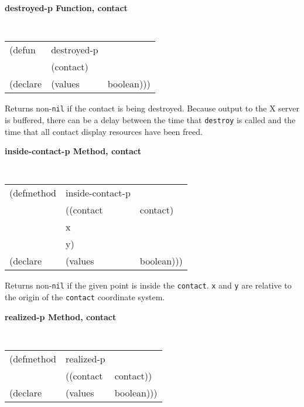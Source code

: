 {\samepage
{\large {\bf destroyed-p \hfill Function, contact}} 
\begin{flushright} \parbox[t]{6.125in}{
\tt
\begin{tabular}{lll}
\raggedright
(defun & destroyed-p & \\ 
& (contact) \\
(declare &(values  & boolean)))
\end{tabular}
\rm

}\end{flushright}}

\begin{flushright} \parbox[t]{6.125in}{
Returns non-{\tt nil} if the contact is being destroyed. Because output to the X
server is buffered, there can be a delay between the time that {\tt destroy} is
called and the time that all contact display resources have been freed.

}\end{flushright}



{\samepage
{\large {\bf inside-contact-p \hfill Method, contact}} 
\begin{flushright} \parbox[t]{6.125in}{
\tt
\begin{tabular}{lll}
\raggedright
(defmethod & inside-contact-p & \\ 
& ((contact & contact)\\
&  x\\
&  y) \\
(declare &(values  & boolean)))
\end{tabular}
\rm

}\end{flushright}}

\begin{flushright} \parbox[t]{6.125in}{
Returns non-{\tt nil} if the given point  is
inside the {\tt contact}. {\tt x} and {\tt y} are relative to the origin of the
{\tt contact} coordinate system.

}\end{flushright}



{\samepage
{\large {\bf realized-p \hfill Method, contact}}

\begin{flushright} \parbox[t]{6.125in}{
\tt
\begin{tabular}{lll}
\raggedright
(defmethod & realized-p & \\
& ((contact  &contact))\\
(declare &(values & boolean)))
\end{tabular}
\rm

}\end{flushright}}

